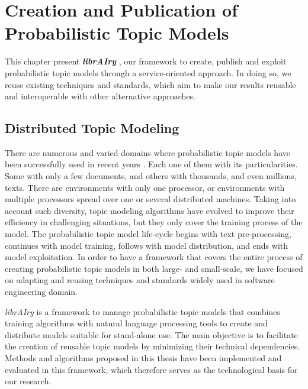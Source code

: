 

\chapter{Creation and Publication of Probabilistic Topic Models}\label{ch:scalability}

\graphicspath{{scalability/figures/}}


This chapter present \textit{\textbf{librAIry}} \citep{Badenes-Olmedo2017}, our framework to create, publish and exploit probabilistic topic models through a service-oriented approach. In doing so, we reuse existing techniques and standards, which aim to make our results reusable and interoperable with other alternative approaches.


\section{Distributed Topic Modeling}
\label{sec:distributed-topic-modeling}


There are numerous and varied domains where probabilistic topic models have been successfully used in recent years \citep{TapiNzali2017, ONeill2017, Greene2016, He2017}. Each one of them with its particularities. Some with only a few documents, and others with thousands, and even millions, texts. There are environments with only one processor, or environments with multiple processors spread over one or several distributed machines. Taking into account such diversity, topic modeling algorithms have evolved to improve their efficiency in challenging situations, but they only cover the training process of the model. The probabilistic topic model life-cycle begins with text pre-processing, continues with model training, follows with model distribution, and ends with model exploitation. In order to have a framework that covers the entire process of creating probabilistic topic models in both large- and small-scale, we have focused on adapting and reusing techniques and standards widely used in software engineering domain. 

\textit{librAIry} is a framework to manage probabilistic topic models that combines training algorithms with natural language processing tools to create and distribute models suitable for stand-alone use. The main objective is to facilitate the creation of reusable topic models by minimizing their technical dependencies. Methods and algorithms proposed in this thesis have been implemented and evaluated in this framework, which therefore serves as the technological basis for our research.

